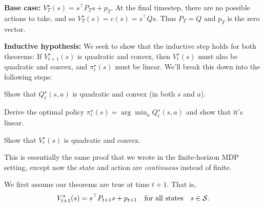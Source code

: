 \documentclass[../main/main]{subfiles}
\begin{document}
\textbf{Base case:} $V^\star_T(s) = s^\top P_T s + p_T.$ At the final timestep, there are no possible actions to take, and so $V^\star_T(s) = c(s) = s^\top Q s.$ Thus $P_T = Q$ and $p_T$ is the zero vector.

\textbf{Inductive hypothesis:} We seek to show that the inductive step holds for both theorems: If $V^\star_{t+1}(s)$ is quadratic and convex, then $V^\star_t(s)$ must also be quadratic and convex, and $\pi^\star_t(s)$ must be linear. We'll break this down into the following steps:
\begin{steps}
    \item Show that $Q^\star_t(s, a)$ is quadratic and convex (in both $s$ and $a$).
    \item Derive the optimal policy $\pi^\star_t(s) = \arg \min_a Q^\star_t(s, a)$ and show that it's linear.
    \item Show that $V^\star_t(s)$ is quadratic and convex.
\end{steps}
This is essentially the same proof that we wrote in the finite-horizon MDP setting,
except now the state and action are \emph{continuous} instead of finite.

We first assume our theorems are true at time $t+1.$ That is,
\[ V^\star_{t+1}(s) = s^\top P_{t+1} s + p_{t+1} \quad \text{for all states} \quad s \in \S. \]
\end{document}
